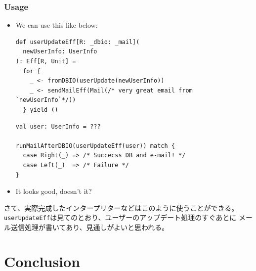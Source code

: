 \begin{frame}[fragile]
  \frametitle{Usage}

  \begin{itemize}
    \item<+-> We can use this like below:
\begin{lstlisting}[style=scala]
def userUpdateEff[R: _dbio: _mail](
  newUserInfo: UserInfo
): Eff[R, Unit] =
  for {
    _ <- fromDBIO(userUpdate(newUserInfo))
    _ <- sendMailEff(Mail(/* very great email from `newUserInfo`*/))
  } yield ()
\end{lstlisting}

\begin{lstlisting}[style=scala]
val user: UserInfo = ???

runMailAfterDBIO(userUpdateEff(user)) match {
  case Right(_) => /* Succecss DB and e-mail! */
  case Left(_)  => /* Failure */
}
\end{lstlisting}

    \item<+-> It looks good, doesn't it?
  \end{itemize}

  \begin{notes}
    \item さて、実際完成したインタープリターなどはこのように使うことができる。
    \lstinline|userUpdateEff|は見てのとおり、ユーザーのアップデート処理のすぐあとに
    メール送信処理が書いてあり、見通しがよいと思われる。
  \end{notes}
\end{frame}

\section{Conclusion}

